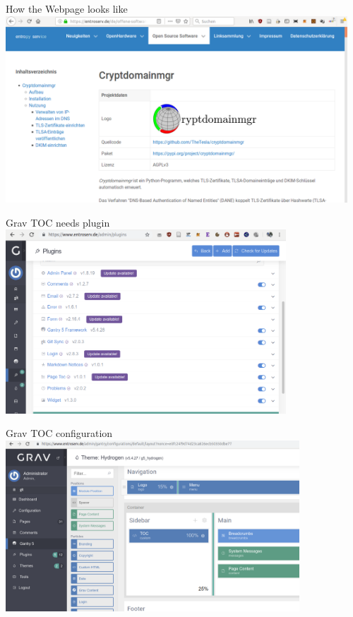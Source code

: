 \documentclass{beamer}
\begin{document}
\begin{frame}[fragile]{\insertsection}{\insertsubsection}
	How the Webpage looks like
	\includegraphics[height=7cm]{gravpage.png}\\
\end{frame}

\begin{frame}[fragile]{\insertsection}{\insertsubsection}
	Grav TOC needs plugin
	\includegraphics[width=10.5cm]{gravplugins.png}\\
\end{frame}

\begin{frame}[fragile]{\insertsection}{\insertsubsection}
	Grav TOC configuration
	\includegraphics[width=11cm]{gravtoc.png}\\
\end{frame}
\end{document}

